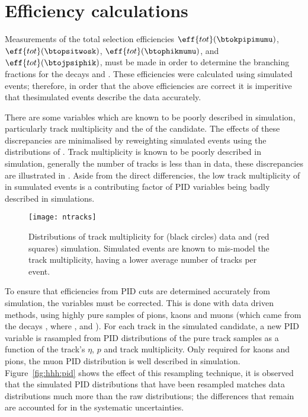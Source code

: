 \section{Efficiency calculations}
Measurements of the total selection efficiencies
$\eff{tot}(\btokpipimumu)$,
$\eff{tot}(\btopsitwosk)$,
$\eff{tot}(\btophikmumu)$, and
$\eff{tot}(\btojpsiphik)$,
must be made in order to determine the branching fractions for the decays \btokpipimumu and
\btophikmumu.
These efficiencies were calculated using simulated events; therefore, in order that the above
efficiencies are correct it is imperitive that thesimulated events describe the data accurately.

There are some variables which are known to be poorly described in simulation, particularly track
multiplicity and the \chisqvtx of the \Bp candidate.
The effects of these discrepancies are minimalised by reweighting simulated events using
the distributions of \btojpsikpipi.
Track multiplicity is known to be poorly described in simulation, generally the number of tracks is
less than in data, these discrepancies are illustrated in .
Aside from the direct differencies, the low track multiplicity of in sumulated events is a
contributing factor of PID variables being badly described in simulations.

\begin{figure}
  \begin{center}
    \texttt{[image: ntracks]}
    \caption{\small
      Distributions of track multiplicity for (black circles) data and (red squares) simulation.
      Simulated events are known to mis-model the track multiplicity, having a lower average number
      of tracks per event.
    }
    \label{fig:hhh:ntracks}
  \end{center}
\end{figure}

To ensure that efficiencies from PID cuts are determined accurately from simulation, the variables
must be corrected.
This is done with data driven methods, using highly pure samples of pions, kaons
and muons (which came from the decays \decay{\Dstarp}{\Dz\pip}, where \decay{\Dz}{\Km\pip}, and
\jpsitomumu).
For each track in the simulated \Bp candidate, a new PID variable is rasampled from PID
distributions of the pure track samples as a function of the track's $\eta$, $p$ and track
multiplicity.
Only required for kaons and pions, the muon PID distribution is well described in simulation.
Figure~\ref{fig:hhh:pid} shows the effect of this resampling technique, it is observed that the
simulated PID distributions that have been resampled matches data distributions much more than the
raw distributions; the differences that remain are accounted for in the systematic uncertainties.

